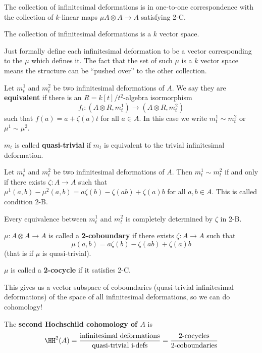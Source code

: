 \documentclass[12pt]{article}
\begin{document}
\begin{cor}
	The collection of infinitesimal deformations is in one-to-one correspondence with the collection of $k$-linear maps $\mu A\otimes A\to A$ 
	satisfying 2-C.
\end{cor}
\begin{cor}
	The collection of infinitesimal deformations is a $k$ vector space.
\end{cor}
\begin{rmk}
	Just formally define each infinitesimal deformation to be a vector corresponding to the $\mu$ which defines it.
	The fact that the set of such $\mu$ is a $k$ vector space means the structure can be ``pushed over'' to the other collection.
\end{rmk}

\begin{defn}
	Let $m_t^1$ and $m_t^2$ be two infinitesimal deformations of $A$. We say they are \textbf{equivalent} if 
	there is an $R=k[t]/t^2$-algebra isormorphism
	\[f_t:(A\otimes R,m_t^1)\to (A\otimes R, m_t^2)\]
	such that $f(a)=a+\zeta(a)t$ for all $a\in A$. In this case we write $m_t^1\sim m_t^2$ or $\mu^1\sim \mu^2$.
\end{defn}
\begin{defn}
	$m_t$ is called \textbf{quasi-trivial} if $m_t$ is equivalent to the trivial infinitesimal deformation.
\end{defn}

\begin{lem}[Condition 2-B]
	Let $m_t^1$ and $m_t^2$ be two infinitesimal deformations of $A$. Then $m_t^1\sim m_t^2$ if and only if 
	there exists $\zeta:A\to A$ such that $\mu^1(a,b)-\mu^2(a,b)=a\zeta(b)-\zeta(ab)+\zeta(a)b$ for all $a,b\in A$.
	This is called condition 2-B.
\end{lem}
\begin{lem}
	Every equivalence between $m_t^1$ and $m_t^2$ is completely determined by $\zeta$ in 2-B.
\end{lem}
\begin{defn}
	$\mu:A\otimes A\to A$ is called a \textbf{2-coboundary} if there exists $\zeta:A\to A$
	such that
	\[\mu(a,b)=a\zeta(b)-\zeta(ab)+\zeta(a)b\]
	(that is if $\mu$ is quasi-trivial).
\end{defn}
\begin{defn}
	$\mu$ is called a \textbf{2-cocycle} if it satisfies 2-C.
\end{defn}
\begin{rmk}
	This gives us a vector subspace of coboundaries (quasi-trivial infinitesimal deformations) of the
	space of all infinitesimal deformations, so we can do cohomology!
\end{rmk}
\begin{defn}
	The \textbf{second Hochschild cohomology of $A$} is
	\[\HH^2(A)=\frac{\text{{infinitesimal deformations}}}{\text{{quasi-trivial i-defs}}}=\frac{\text{{2-cocycles}}}{\text{{2-coboundaries}}}\]
\end{defn}
\end{document}
